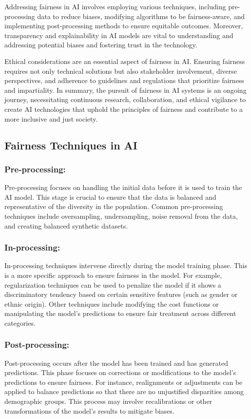 \documentclass[12pt,a4paper,openright,twoside]{book}
\begin{document}
Addressing fairness in AI involves employing various techniques, including pre-processing data to reduce biases, modifying algorithms to be fairness-aware, and implementing post-processing methods to ensure equitable outcomes. Moreover, transparency and explainability in AI models are vital to understanding and addressing potential biases and fostering trust in the technology. \cite{10.1145/3457607}  \cite{10.1145/3194770.3194776}

Ethical considerations are an essential aspect of fairness in AI. Ensuring fairness requires not only technical solutions but also stakeholder involvement, diverse perspectives, and adherence to guidelines and regulations that prioritize fairness and impartiality. In summary, the pursuit of fairness in AI systems is an ongoing journey, necessitating continuous research, collaboration, and ethical vigilance to create AI technologies that uphold the principles of fairness and contribute to a more inclusive and just society.


\subsection{Fairness Techniques in AI}

\subsubsection{Pre-processing:}
Pre-processing focuses on handling the initial data before it is used to train the AI model. This stage is crucial to ensure that the data is balanced and representative of the diversity in the population. Common pre-processing techniques include oversampling, undersampling, noise removal from the data, and creating balanced synthetic datasets.

\subsubsection{In-processing:}
In-processing techniques intervene directly during the model training phase. This is a more specific approach to ensure fairness in the model. For example, regularization techniques can be used to penalize the model if it shows a discriminatory tendency based on certain sensitive features (such as gender or ethnic origin). Other techniques include modifying the cost functions or manipulating the model's predictions to ensure fair treatment across different categories.

\subsubsection{Post-processing:}
Post-processing occurs after the model has been trained and has generated predictions. This phase focuses on corrections or modifications to the model's predictions to ensure fairness. For instance, realignments or adjustments can be applied to balance predictions so that there are no unjustified disparities among demographic groups. This process may involve recalibrations or other transformations of the model's results to mitigate biases.
\end{document}
